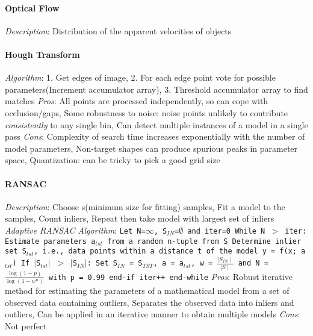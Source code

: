 \documentclass{article}
\begin{document}
\begin{multicols*}{2}
        \paragraph*{Optical Flow}
        \textit{Description}: Distribution of the apparent velocities of objects\newline
        \paragraph*{Hough Transform}
        \textit{Algorithm}: 1. Get edges of image, 2. For each edge point vote for possible parameters(Increment
        accumulator array), 3. Threshold accumulator array to find matches\newline
        \textit{Pros}: All points are processed independently, so can cope with occlusion/gaps, Some robustness to
        noise: noise points unlikely to contribute \textit{consistently} to any single bin, Can detect multiple
        instances of a model in a single pass\newline
        \textit{Cons}: Complexity of search time increases exponentially with the number of model parameters,
        Non-target shapes can produce spurious peaks in parameter space, Quantization: can be tricky to pick a good
        grid size
        \paragraph*{RANSAC}
        \textit{Description}: Choose s(minimum size for fitting) samples, Fit a model to the samples, Count inliers,
        Repeat then take model with largest set of inliers\newline
        \textit{Adaptive RANSAC Algorithm}:
        \texttt{Let N=$\infty$, S$_{IN}$=$\emptyset$ and iter=0\newline
        While N $>$ iter:\newline
        Estimate parameters a$_{tst}$ from a random n-tuple from S\newline
        Determine inlier set S$_{tst}$, i.e., data points within a distance t of the model y = f(x; a$_{tst}$)\newline
        If $\mid$S$_{tst}$$\mid$ $>$ $\mid$S$_{IN}$$\mid$:\newline
        Set S$_{IN}$ = S$_{TST}$, a = a$_{tst}$, w = $\frac{\mid S_{IN}\mid}{\mid S\mid}$ and N =
            $\frac{\log(1-p)}{\log(1-w^n)}$ with p = 0.99\newline
            end-if\newline
            iter++\newline
            end-while}\newline
        \textit{Pros}: Robust iterative method for estimating the parameters of a mathematical model from a set of
        observed data containing outliers, Separates the observed data into inliers and outliers, Can be applied in an
        iterative manner to obtain multiple models\newline
        \textit{Cons}: Not perfect

\end{multicols*}
\end{document}
